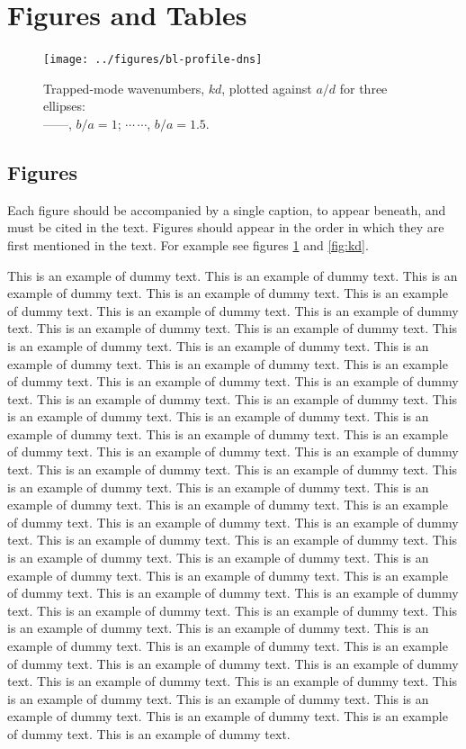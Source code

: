 \documentclass[lineno]{jfm}
\begin{document}
\section{Figures and Tables}\label{sec:Figures_Tables}

\begin{figure}
  \centerline{\texttt{[image: ../figures/bl-profile-dns]}}%
  \caption{Trapped-mode wavenumbers, $kd$, plotted against $a/d$ for
    three ellipses:\protect\\
    ---$\!$---,
    $b/a=1$; $\cdots$\,$\cdots$, $b/a=1.5$.}
\label{fig:ka}
\end{figure}

\subsection{Figures}
 Each figure should be accompanied by a single caption, to appear beneath, and must be cited in the text. Figures should appear in the order in which they are first mentioned in the text. For example see figures \ref{fig:ka} and \ref{fig:kd}.

 This is an example of dummy text. This is an example of dummy text. This is an example of dummy text. This is an example of dummy text. This is an example of dummy text. This is an example of dummy text. This is an example of dummy text. This is an example of dummy text. This is an example of dummy text. This is an example of dummy text. This is an example of dummy text. This is an example of dummy text. This is an example of dummy text. This is an example of dummy text. This is an example of dummy text. This is an example of dummy text. This is an example of dummy text. This is an example of dummy text. This is an example of dummy text. This is an example of dummy text. This is an example of dummy text. This is an example of dummy text. This is an example of dummy text. This is an example of dummy text. This is an example of dummy text. This is an example of dummy text. This is an example of dummy text. This is an example of dummy text. This is an example of dummy text. This is an example of dummy text. This is an example of dummy text. This is an example of dummy text. This is an example of dummy text. This is an example of dummy text. This is an example of dummy text. This is an example of dummy text. This is an example of dummy text. This is an example of dummy text. This is an example of dummy text. This is an example of dummy text. This is an example of dummy text. This is an example of dummy text. This is an example of dummy text. This is an example of dummy text. This is an example of dummy text. This is an example of dummy text. This is an example of dummy text. This is an example of dummy text. This is an example of dummy text. This is an example of dummy text. This is an example of dummy text. This is an example of dummy text. This is an example of dummy text. This is an example of dummy text. This is an example of dummy text. This is an example of dummy text. This is an example of dummy text. This is an example of dummy text. This is an example of dummy text. This is an example of dummy text.
\end{document}
